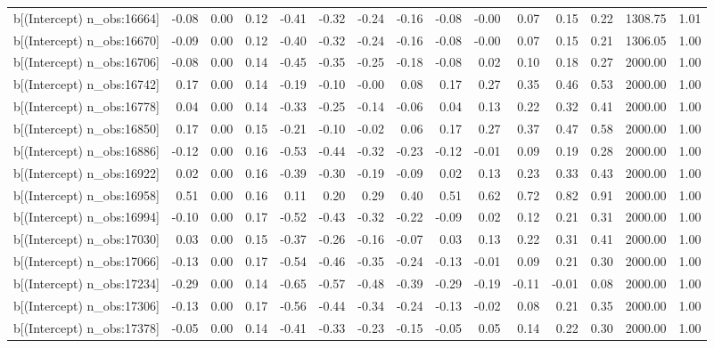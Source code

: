 \begin{table}[ht]
\begin{tabular}{rrrrrrrrrrrrrrr}
  b[(Intercept) n\_obs:16664] & -0.08 & 0.00 & 0.12 & -0.41 & -0.32 & -0.24 & -0.16 & -0.08 & -0.00 & 0.07 & 0.15 & 0.22 & 1308.75 & 1.01 \\ 
  b[(Intercept) n\_obs:16670] & -0.09 & 0.00 & 0.12 & -0.40 & -0.32 & -0.24 & -0.16 & -0.08 & -0.00 & 0.07 & 0.15 & 0.21 & 1306.05 & 1.00 \\ 
  b[(Intercept) n\_obs:16706] & -0.08 & 0.00 & 0.14 & -0.45 & -0.35 & -0.25 & -0.18 & -0.08 & 0.02 & 0.10 & 0.18 & 0.27 & 2000.00 & 1.00 \\ 
  b[(Intercept) n\_obs:16742] & 0.17 & 0.00 & 0.14 & -0.19 & -0.10 & -0.00 & 0.08 & 0.17 & 0.27 & 0.35 & 0.46 & 0.53 & 2000.00 & 1.00 \\ 
  b[(Intercept) n\_obs:16778] & 0.04 & 0.00 & 0.14 & -0.33 & -0.25 & -0.14 & -0.06 & 0.04 & 0.13 & 0.22 & 0.32 & 0.41 & 2000.00 & 1.00 \\ 
  b[(Intercept) n\_obs:16850] & 0.17 & 0.00 & 0.15 & -0.21 & -0.10 & -0.02 & 0.06 & 0.17 & 0.27 & 0.37 & 0.47 & 0.58 & 2000.00 & 1.00 \\ 
  b[(Intercept) n\_obs:16886] & -0.12 & 0.00 & 0.16 & -0.53 & -0.44 & -0.32 & -0.23 & -0.12 & -0.01 & 0.09 & 0.19 & 0.28 & 2000.00 & 1.00 \\ 
  b[(Intercept) n\_obs:16922] & 0.02 & 0.00 & 0.16 & -0.39 & -0.30 & -0.19 & -0.09 & 0.02 & 0.13 & 0.23 & 0.33 & 0.43 & 2000.00 & 1.00 \\ 
  b[(Intercept) n\_obs:16958] & 0.51 & 0.00 & 0.16 & 0.11 & 0.20 & 0.29 & 0.40 & 0.51 & 0.62 & 0.72 & 0.82 & 0.91 & 2000.00 & 1.00 \\ 
  b[(Intercept) n\_obs:16994] & -0.10 & 0.00 & 0.17 & -0.52 & -0.43 & -0.32 & -0.22 & -0.09 & 0.02 & 0.12 & 0.21 & 0.31 & 2000.00 & 1.00 \\ 
  b[(Intercept) n\_obs:17030] & 0.03 & 0.00 & 0.15 & -0.37 & -0.26 & -0.16 & -0.07 & 0.03 & 0.13 & 0.22 & 0.31 & 0.41 & 2000.00 & 1.00 \\ 
  b[(Intercept) n\_obs:17066] & -0.13 & 0.00 & 0.17 & -0.54 & -0.46 & -0.35 & -0.24 & -0.13 & -0.01 & 0.09 & 0.21 & 0.30 & 2000.00 & 1.00 \\ 
  b[(Intercept) n\_obs:17234] & -0.29 & 0.00 & 0.14 & -0.65 & -0.57 & -0.48 & -0.39 & -0.29 & -0.19 & -0.11 & -0.01 & 0.08 & 2000.00 & 1.00 \\ 
  b[(Intercept) n\_obs:17306] & -0.13 & 0.00 & 0.17 & -0.56 & -0.44 & -0.34 & -0.24 & -0.13 & -0.02 & 0.08 & 0.21 & 0.35 & 2000.00 & 1.00 \\ 
  b[(Intercept) n\_obs:17378] & -0.05 & 0.00 & 0.14 & -0.41 & -0.33 & -0.23 & -0.15 & -0.05 & 0.05 & 0.14 & 0.22 & 0.30 & 2000.00 & 1.00 \\ 

\end{tabular}
\end{table}
